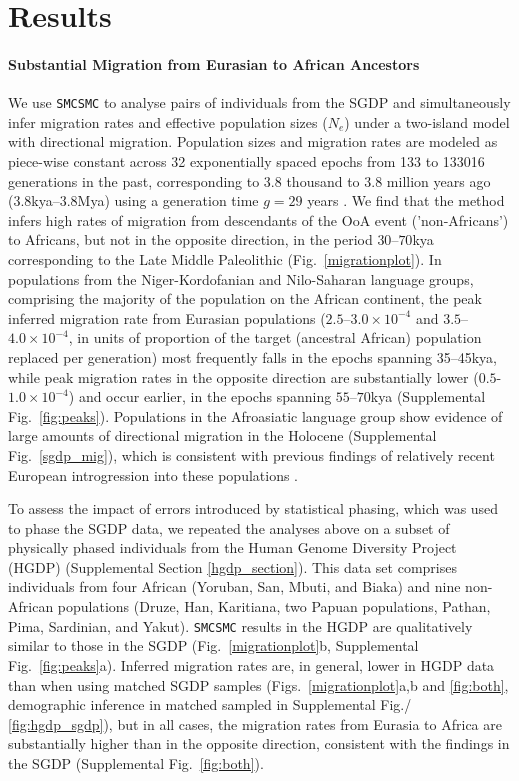 \section{Results}

\paragraph{Substantial Migration from Eurasian to African Ancestors} We use {\tt SMCSMC} to analyse pairs of individuals from the SGDP and simultaneously infer migration rates and effective population sizes ($N_e$) under a two-island model with directional migration.  Population sizes and migration rates are modeled as piece-wise constant across 32 exponentially spaced epochs from 133 to 133016 generations in the past, corresponding to 3.8 thousand to 3.8 million years ago (3.8kya--3.8Mya) using a generation time $g=29$ years \cite{Fenner2005}.  We find that the method infers high rates of migration from descendants of the OoA event ('non-Africans') to Africans, but not in the opposite direction, in the period $30$--$70$kya corresponding to the Late Middle Paleolithic (Fig.\ \ref{migrationplot}). In populations from the Niger-Kordofanian and Nilo-Saharan language groups, comprising the majority of the population on the African continent, the peak inferred migration rate from Eurasian populations ($2.5$--$3.0\times 10^{-4}$ and $3.5$--$4.0\times 10^{-4}$, in units of proportion of the target (ancestral African) population replaced per generation) most frequently falls in the epochs spanning 35--45kya, while peak migration rates in the opposite direction are substantially lower ($0.5$-$1.0\times 10^{-4}$) and occur earlier, in the epochs spanning $55$--$70$kya (Supplemental Fig.\ \ref{fig:peaks}). Populations in the Afroasiatic language group show evidence of large amounts of directional migration in the Holocene (Supplemental Fig.\ \ref{sgdp_mig}), which is consistent with previous findings of relatively recent European introgression into these populations \cite{Busby2016, Fan2019}. 

To assess the impact of errors introduced by statistical phasing, which was used to phase the SGDP data, we repeated the analyses above on a subset of physically phased individuals from the Human Genome Diversity Project (HGDP) \cite{Mallick2016} (Supplemental Section \ref{hgdp_section}). This data set comprises individuals from four African (Yoruban, San, Mbuti, and Biaka) and nine non-African populations (Druze, Han, Karitiana, two Papuan populations, Pathan, Pima, Sardinian, and Yakut). {\tt SMCSMC} results in the HGDP are qualitatively similar to those in the SGDP (Fig.\ \ref{migrationplot}b, Supplemental Fig.\ \ref{fig:peaks}a). Inferred migration rates are, in general, lower in HGDP data than when using matched SGDP samples (Figs.\ \ref{migrationplot}a,b and \ref{fig:both}, demographic inference in matched sampled in Supplemental Fig./ \ref{fig:hgdp_sgdp}), but in all cases, the migration rates from Eurasia to Africa are substantially higher than in the opposite direction, consistent with the findings in the SGDP (Supplemental Fig.\ \ref{fig:both}). 

